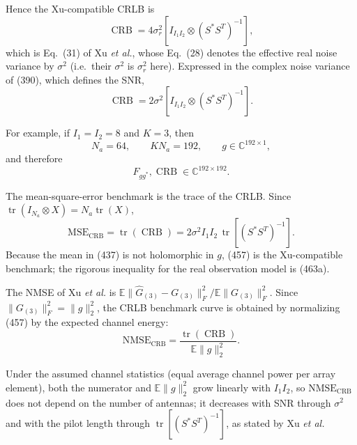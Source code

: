 \documentclass[12pt,a4paper]{article}
\begin{document}
Hence the Xu-compatible CRLB is
\begin{equation}
\boxed{
\operatorname{CRB}
=
4\sigma_r^2
\left[
I_{I_1I_2}\otimes(S^*S^T)^{-1}
\right],
}
\tag{453}
\end{equation}
which is Eq.~(31) of Xu \emph{et al.}, whose Eq.~(28) denotes the
effective real noise variance by $\sigma^2$ (i.e.\ their $\sigma^2$ is
$\sigma_r^2$ here). Expressed in the complex noise variance of (390),
which defines the SNR,
\begin{equation}
\boxed{
\operatorname{CRB}
=
2\sigma^2
\left[
I_{I_1I_2}\otimes(S^*S^T)^{-1}
\right].
}
\tag{454}
\end{equation}

For example, if $I_1=I_2=8$ and $K=3$, then
\begin{equation}
N_a=64,
\qquad
KN_a=192,
\qquad
g\in\mathbb C^{192\times1},
\tag{455}
\end{equation}
and therefore
\begin{equation}
F_{gg^*},\operatorname{CRB}
\in\mathbb C^{192\times192}.
\tag{456}
\end{equation}

The mean-square-error benchmark is the trace of the CRLB. Since
$\operatorname{tr}(I_{N_a}\otimes X)=N_a\operatorname{tr}(X)$,
\begin{equation}
\boxed{
\mathrm{MSE}_{\mathrm{CRB}}
=
\operatorname{tr}\!\left(\operatorname{CRB}\right)
=
2\sigma^2 I_1I_2\,
\operatorname{tr}\!\left[(S^*S^T)^{-1}\right].
}
\tag{457}
\end{equation}
Because the mean in (437) is not holomorphic in $g$, (457) is the Xu-compatible
benchmark; the rigorous inequality for the real observation model is (463a).

The NMSE of Xu \emph{et al.} is
$\mathbb E\|\hat G_{(3)}-G_{(3)}\|_F^2/\mathbb E\|G_{(3)}\|_F^2$. Since
$\|G_{(3)}\|_F^2=\|g\|_2^2$, the CRLB benchmark curve is obtained by
normalizing (457) by the expected channel energy:
\begin{equation}
\boxed{
\mathrm{NMSE}_{\mathrm{CRB}}
=
\frac{\operatorname{tr}\!\left(\operatorname{CRB}\right)}
{\mathbb E\|g\|_2^2}.
}
\tag{457a}
\end{equation}

Under the assumed channel statistics (equal average channel power per array
element), both the numerator and $\mathbb E\|g\|_2^2$ grow linearly with
$I_1I_2$, so $\mathrm{NMSE}_{\mathrm{CRB}}$ does not depend on the
number of antennas; it decreases with SNR through $\sigma^2$ and with
the pilot length through $\operatorname{tr}[(S^*S^T)^{-1}]$, as stated
by Xu \emph{et al.}
\end{document}
